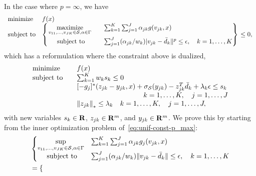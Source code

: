 \documentclass[12pt]{article}
\theoremstyle{thmstyleone}%
\theoremstyle{thmstyletwo}%
\theoremstyle{thmstylethree}%
\newcommand{\reviewChanges}{}
\begin{document}
\begin{appendices}
\reviewChanges{In the case where ${p = \infty}$, we have
\begin{equation}
	\label{eq:unif-const-p_max}
	\begin{array}{ll}
		\mbox{minimize} & f(x)\\
		\mbox{subject to} & \begin{dcases}
			\begin{rcases}
		\underset{v_{11},\dots,v_{JK} \in \mathcal{S}, \alpha \in \Gamma}{\text{maximize}} &\quad \sum_{k=1} ^K\sum_{j=1} ^J  \alpha_{jk} g(v_{jk}, x) \\
		\mbox{~~~~subject to} & \quad  \sum_{j=1}^J (\alpha_{jk}/w_k)| v_{jk} - \bar{d}_k \|^p  \le \epsilon, \quad k = 1,\dots, K
			\end{rcases}
			\end{dcases} \le 0,
	\end{array}
\end{equation}
which has a reformulation where the constraint above is dualized,}
\reviewChanges{
	\begin{equation}
	\label{eq:unif-dual-p_max}
	\begin{array}{ll}
		\text{minimize} & f(x)\\
 \text{subject to} \quad & \sum_{k=1}^{K} w_k s_k \leq 0\\
&[-g_j]^*(z_{jk} - y_{jk},x) + \sigma_{{\supp}}(y_{jk}) - z_{jk}^T\bar{d}_k  + \lambda_k \epsilon \leq s_k\\
& \hspace{3cm} \quad k = 1,\dots, K, \quad j = 1,\dots, J\\
&  \left\|z_{jk} \right\|_* \leq \lambda_k \quad k = 1,\dots, K, \quad j = 1,\dots, J,
\end{array}
\end{equation}
with new variables $s_k \in {\mathbf R}$, $z_{jk} \in {\mathbf R}^m$, and $y_{jk} \in {\mathbf R}^m$. }
\reviewChanges{
We prove this by starting from the inner optimization problem of~\eqref{eq:unif-const-p_max}:
\begin{equation*}
	\begin{aligned}
		& \begin{cases}
			\underset{v_{11}, \dots, v_{JK} \in \mathcal{S}, \alpha \in \Gamma}{\sup} &\sum_{k=1}^K \sum_{j=1}^J \alpha_{jk} g_j(v_{jk}, x) \\
			\mbox{~~~~subject to} & \sum_{j=1}^J (\alpha_{jk}/w_k) \|v_{jk} - \bar{d}_k\| \le \epsilon, \quad k = 1,\dots,K
		\end{cases}\\
		&=\begin{cases}

\end{cases}
\end{aligned}
\end{equation*}}
\end{appendices}
\end{document}
